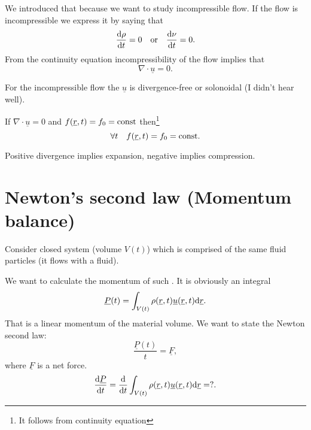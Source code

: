 \documentclass[11pt,oneside]{book}
\renewcommand{\vec}[1]{\underline{#1}}
\theoremstyle{definition} %
\theoremstyle{plain} %
\theoremstyle{remark} %
\theoremstyle{underline}
\begin{document}
  We introduced that because we want to study incompressible flow.
  If the flow is incompressible we express it by saying that
  \begin{displaymath}
    \frac{\mathrm{d} \rho}{\mathrm{d} t} = 0 \quad \textrm{or}\quad  \frac{\mathrm{d} \nu}{\mathrm{d} t} = 0.
  \end{displaymath}
  From the continuity equation incompressibility of the flow implies that
  \begin{displaymath}
    \nabla \cdot \vec u = 0.
  \end{displaymath}
  
  For the incompressible flow the $\vec u$ is divergence-free or solonoidal (\todo I didn't hear well).

  If $\nabla \cdot \vec u = 0$ and $ f(\vec r, t) = f_0 = \tm{const}$ then\footnote{It follows from continuity equation}
  \begin{displaymath}
    \forall t \quad f(\vec r, t) = f_0 = \tm{const}.
  \end{displaymath}

  Positive divergence implies expansion, negative implies compression.
  

  \section{Newton's second law (Momentum balance)}
  Consider closed system (volume $V(t)$) which is comprised of the same fluid particles
  (it flows with a fluid). 

  \begin{figure}[h]
    \centering
  \end{figure}

  We want to calculate the momentum of such .
  It is obviously an integral
  \begin{displaymath}
    \vec P (t) = \int_{V(t)} \rho(\vec r, t) \vec u(\vec r, t) \d \vec r.
  \end{displaymath}
  That is a linear momentum of the material volume.
  We want to state the Newton second law:
  \begin{displaymath}
    \dfrac{\vec P(t)}{t} = \vec F, 
  \end{displaymath}
  where $\vec F$ is a net force.
  \begin{displaymath}
    \dfrac{\vec P}{t} = \dfrac{}{t} \int_{V(t)} \rho(\vec r, t) \vec u (\vec r, t) \d \vec r = ?.
  \end{displaymath}
  
\end{document}
